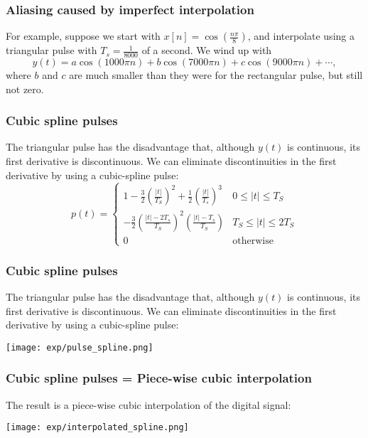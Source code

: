 \documentclass{beamer}
\begin{document}
\begin{frame}
  \frametitle{Aliasing caused by imperfect interpolation}

  For example, suppose we start with
  $x[n]=\cos\left(\frac{n\pi}{8}\right)$, and interpolate using a
  triangular pulse with $T_s=\frac{1}{8000}$ of a second.  We wind up
  with
  \begin{displaymath}
    y(t) = a\cos\left(1000\pi n\right)+b\cos\left(7000\pi n\right)+c\cos\left(9000\pi n\right)+\cdots,
  \end{displaymath}
  where $b$ and $c$ are much smaller than they were for the rectangular pulse, but
  still not zero. 
\end{frame}

\begin{frame}
  \frametitle{Cubic spline pulses}

  The triangular pulse has the disadvantage that, although $y(t)$ is continuous, its
  first derivative is discontinuous.  We can eliminate discontinuities in the first derivative
  by using a cubic-spline pulse:
  \begin{displaymath}
    p(t) = \begin{cases}
      1-\frac{3}{2}\left(\frac{|t|}{T_S}\right)^2 +\frac{1}{2}\left(\frac{|t|}{T_s}\right)^3 & 0\le |t|\le T_S\\
      -\frac{3}{2}\left(\frac{|t|-2T_s}{T_S}\right)^2\left(\frac{|t|-T_s}{T_S}\right) & T_S\le |t|\le 2T_S\\
      0 & \mbox{otherwise}
    \end{cases}
  \end{displaymath}

\end{frame}

\begin{frame}
  \frametitle{Cubic spline pulses}

  The triangular pulse has the disadvantage that, although $y(t)$ is continuous, its
  first derivative is discontinuous.  We can eliminate discontinuities in the first derivative
  by using a cubic-spline pulse:
  \centerline{\texttt{[image: exp/pulse\_spline.png]}}  
\end{frame}

\begin{frame}
  \frametitle{Cubic spline pulses = Piece-wise cubic interpolation}

  The result is a  piece-wise cubic interpolation of the digital signal:

  \centerline{\texttt{[image: exp/interpolated\_spline.png]}}  
\end{frame}
\end{document}
